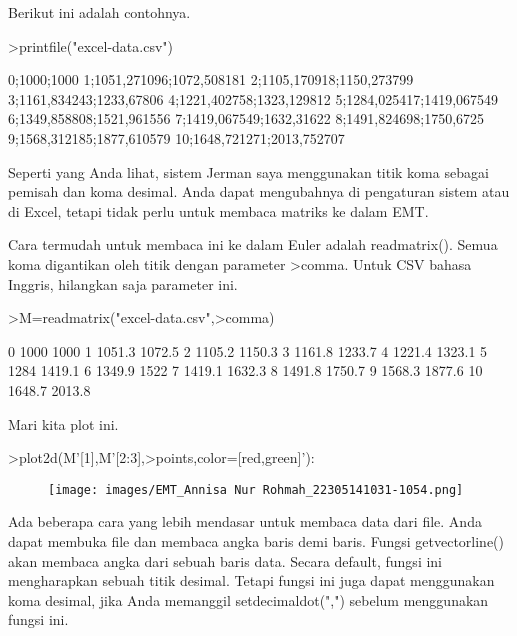 \documentclass[a4paper,10pt]{article}
\begin{document}
\begin{eulernotebook}
\begin{eulercomment}
\begin{eulercomment}
\begin{eulercomment}
\begin{eulercomment}
\begin{eulercomment}
Berikut ini adalah contohnya.
\end{eulercomment}
\begin{eulerprompt}
>printfile("excel-data.csv")
\end{eulerprompt}
\begin{euleroutput}
  0;1000;1000
  1;1051,271096;1072,508181
  2;1105,170918;1150,273799
  3;1161,834243;1233,67806
  4;1221,402758;1323,129812
  5;1284,025417;1419,067549
  6;1349,858808;1521,961556
  7;1419,067549;1632,31622
  8;1491,824698;1750,6725
  9;1568,312185;1877,610579
  10;1648,721271;2013,752707
\end{euleroutput}
\begin{eulercomment}
Seperti yang Anda lihat, sistem Jerman saya menggunakan titik koma
sebagai pemisah dan koma desimal. Anda dapat mengubahnya di pengaturan
sistem atau di Excel, tetapi tidak perlu untuk membaca matriks ke
dalam EMT.

Cara termudah untuk membaca ini ke dalam Euler adalah readmatrix().
Semua koma digantikan oleh titik dengan parameter \textgreater{}comma. Untuk CSV
bahasa Inggris, hilangkan saja parameter ini.
\end{eulercomment}
\begin{eulerprompt}
>M=readmatrix("excel-data.csv",>comma)
\end{eulerprompt}
\begin{euleroutput}
          0      1000      1000 
          1    1051.3    1072.5 
          2    1105.2    1150.3 
          3    1161.8    1233.7 
          4    1221.4    1323.1 
          5      1284    1419.1 
          6    1349.9      1522 
          7    1419.1    1632.3 
          8    1491.8    1750.7 
          9    1568.3    1877.6 
         10    1648.7    2013.8 
\end{euleroutput}
\begin{eulercomment}
Mari kita plot ini.
\end{eulercomment}
\begin{eulerprompt}
>plot2d(M'[1],M'[2:3],>points,color=[red,green]'):
\end{eulerprompt}
\begin{figure}[h]
    \centering
    \texttt{[image: images/EMT\_Annisa Nur Rohmah\_22305141031-1054.png]}
\end{figure}
\begin{eulercomment}
Ada beberapa cara yang lebih mendasar untuk membaca data dari file.
Anda dapat membuka file dan membaca angka baris demi baris. Fungsi
getvectorline() akan membaca angka dari sebuah baris data. Secara
default, fungsi ini mengharapkan sebuah titik desimal. Tetapi fungsi
ini juga dapat menggunakan koma desimal, jika Anda memanggil
setdecimaldot(",") sebelum menggunakan fungsi ini.


\end{eulercomment}
\end{eulercomment}
\end{eulercomment}
\end{eulercomment}
\end{eulercomment}
\end{eulernotebook}
\end{document}
